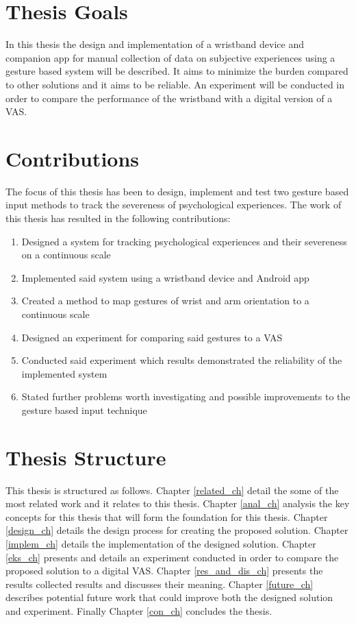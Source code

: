 \section{Thesis Goals}
In this thesis the design and implementation of a wristband device and companion app for manual collection of data on subjective experiences using a gesture based system will be described. It aims to minimize the burden compared to other solutions and it aims to be reliable. An experiment will be conducted in order to compare the performance of the wristband with a digital version of a VAS.

\section{Contributions}
The focus of this thesis has been to design, implement and test two gesture based input methods to track the severeness of psychological experiences. The work of this thesis has resulted in the following contributions:

\begin{enumerate}
    \item Designed a system for tracking psychological experiences and their severeness on a continuous scale
    \item Implemented said system using a wristband device and Android app
    \item Created a method to map gestures of wrist and arm orientation to a continuous scale
    \item Designed an experiment for comparing said gestures to a VAS
    \item Conducted said experiment which results demonstrated the reliability of the implemented system
    \item Stated further problems worth investigating and possible improvements to the gesture based input technique
\end{enumerate}


\section{Thesis Structure}
This thesis is structured as follows. Chapter \ref{related_ch} detail the some of the most related work and it relates to this thesis. Chapter \ref{anal_ch} analysis the key concepts for this thesis that will form the foundation for this thesis. Chapter \ref{design_ch} details the design process for creating the proposed solution. Chapter \ref{implem_ch} details the implementation of the designed solution. Chapter \ref{eks_ch} presents and details an experiment conducted in order to compare the proposed solution to a digital VAS. Chapter \ref{res_and_dis_ch} presents the results collected results and discusses their meaning. Chapter \ref{future_ch} describes potential future work that could improve both the designed solution and experiment. Finally Chapter \ref{con_ch} concludes the thesis.





